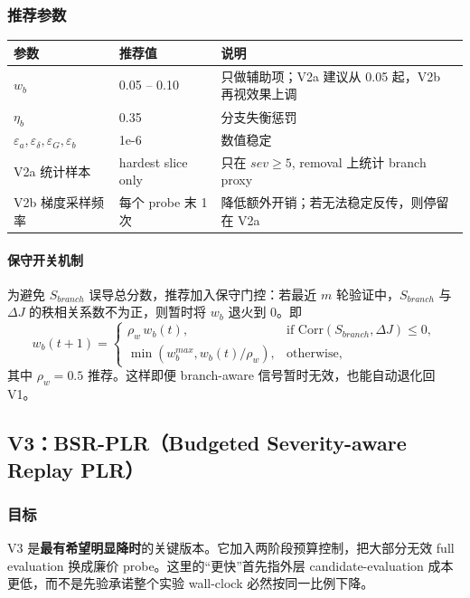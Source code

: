 \documentclass[11pt,a4paper]{ctexart}
\begin{document}
\subsubsection*{推荐参数}
\begin{center}
\begin{tabular}{p{4.0cm}p{3.0cm}p{6.4cm}}
\toprule
参数 & 推荐值 & 说明 \\
\midrule
\(w_b\) & 0.05 -- 0.10 & 只做辅助项；V2a 建议从 0.05 起，V2b 再视效果上调 \\
\(\eta_b\) & 0.35 & 分支失衡惩罚 \\
\(\varepsilon_a,\varepsilon_\delta,\varepsilon_G,\varepsilon_b\) & 1e-6 & 数值稳定 \\
V2a 统计样本 & hardest slice only & 只在 \(sev\ge 5\), removal 上统计 branch proxy \\
V2b 梯度采样频率 & 每个 probe 末 1 次 & 降低额外开销；若无法稳定反传，则停留在 V2a \\
\bottomrule
\end{tabular}
\end{center}

\paragraph{保守开关机制}
为避免 \(S_{branch}\) 误导总分数，推荐加入保守门控：若最近 \(m\) 轮验证中，\(S_{branch}\) 与 \(\Delta J\) 的秩相关系数不为正，则暂时将 \(w_b\) 退火到 0。即
\begin{equation}
 w_b(t+1)=
 \begin{cases}
 \rho_w\, w_b(t), & \text{if } \mathrm{Corr}(S_{branch},\Delta J) \le 0,\\
 \min(w_b^{max}, w_b(t)/\rho_w), & \text{otherwise},
 \end{cases}
\label{eq:wb_schedule}
\end{equation}
其中 \(\rho_w=0.5\) 推荐。这样即便 branch-aware 信号暂时无效，也能自动退化回 V1。

\subsection{V3：BSR-PLR（Budgeted Severity-aware Replay PLR）}
\subsubsection*{目标}
V3 是\textbf{最有希望明显降时}的关键版本。它加入两阶段预算控制，把大部分无效 full evaluation 换成廉价 probe。这里的“更快”首先指外层 candidate-evaluation 成本更低，而不是先验承诺整个实验 wall-clock 必然按同一比例下降。
\end{document}
